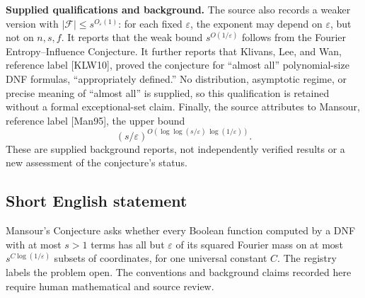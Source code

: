 \documentclass[11pt]{article}
\begin{document}
\textbf{Supplied qualifications and background.}
The source also records a weaker version with \(|\mathcal F|\leq s^{O_\varepsilon(1)}\): for each fixed \(\varepsilon\), the exponent may depend on \(\varepsilon\), but not on \(n,s,f\). It reports that the weak bound \(s^{O(1/\varepsilon)}\) follows from the Fourier Entropy--Influence Conjecture. It further reports that Klivans, Lee, and Wan, reference label [KLW10], proved the conjecture for ``almost all'' polynomial-size DNF formulas, ``appropriately defined.'' No distribution, asymptotic regime, or precise meaning of ``almost all'' is supplied, so this qualification is retained without a formal exceptional-set claim. Finally, the source attributes to Mansour, reference label [Man95], the upper bound
\[
(s/\varepsilon)^{O(\log\log(s/\varepsilon)\,\log(1/\varepsilon))}.
\]
These are supplied background reports, not independently verified results or a new assessment of the conjecture's status.
\subsection{Short English statement}
Mansour's Conjecture asks whether every Boolean function computed by a DNF with at most \(s>1\) terms has all but \(\varepsilon\) of its squared Fourier mass on at most \(s^{C\log(1/\varepsilon)}\) subsets of coordinates, for one universal constant \(C\). The registry labels the problem open. The conventions and background claims recorded here require human mathematical and source review.
\end{document}
